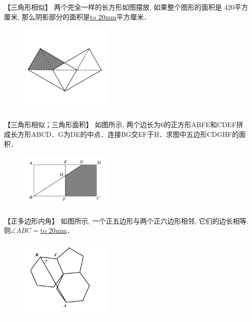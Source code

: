 \item {
    【三角形相似】
    {两个完全一样的长方形如图摆放, 如果整个图形的面积是 420平方厘米, 那么阴影部分的面积是\underline{\hbox to 20mm{}}平方厘米．} 
    \begin{figure}[H] 
        \centering
        \includegraphics[width=0.4\textwidth]{./pics/Chapter_2/5.png}
    \end{figure}
    \vspace{1cm}
}

\item {
    【三角形相似；三角形面积】
    {如图所示, 两个边长为6的正方形ABFE和CDEF拼成长方形ABCD．G为DE的中点．连接BG交EF于H．求图中五边形CDGHF的面积．} 
    \begin{figure}[H] 
        \centering
        \includegraphics[width=0.4\textwidth]{./pics/Chapter_2/13.png}
    \end{figure}
    \vspace{1cm}
}

\item {
    【正多边形内角】
    {如图所示, 一个正五边形与两个正六边形相邻, 它们的边长相等. 则$\angle ABC = $\underline{\hbox to 20mm{}}．} 
    \begin{figure}[H] 
        \centering
        \includegraphics[width=0.4\textwidth]{./pics/Chapter_2/7.png}
    \end{figure}
    \vspace{1cm}
}

